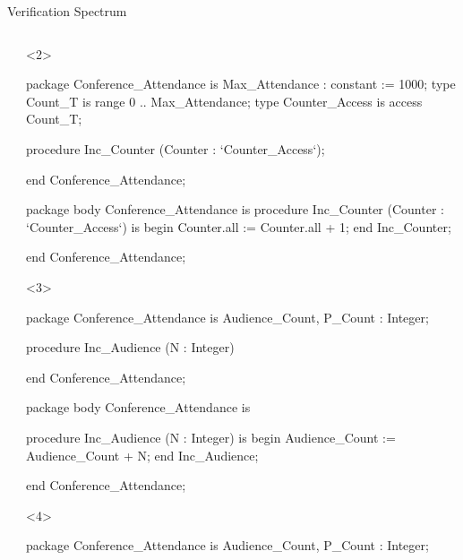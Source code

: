 \documentclass{beamer}
\begin{document}
\begin{frame}[fragile]{Verification Spectrum}
\begin{columns}
\begin{column}{2cm}
    \end{column}

    \begin{column}{9cm}

      \begin{onlyenv}<2>
      \begin{pxcode}[language=SPARK,style=magic,gobble=8]
        package Conference_Attendance
        is
           Max_Attendance : constant := 1000;
           type Count_T is range 0 .. Max_Attendance;
           type Counter_Access is access Count_T;

           procedure Inc_Counter (Counter : `Counter_Access`);

        end Conference_Attendance;

        package body Conference_Attendance
        is
           procedure Inc_Counter (Counter : `Counter_Access`)
           is
           begin
              Counter.all := Counter.all + 1;
           end Inc_Counter;

        end Conference_Attendance;

      \end{pxcode}
      \end{onlyenv}

      \begin{onlyenv}<3>
      \begin{pxcode}[language=SPARK,style=magic,gobble=8]
        package Conference_Attendance
        is
           Audience_Count, P_Count : Integer;

           procedure Inc_Audience (N : Integer)

        end Conference_Attendance;

        package body Conference_Attendance
        is

           procedure Inc_Audience (N : Integer)
           is
           begin
              Audience_Count := Audience_Count + N;
           end Inc_Audience;

        end Conference_Attendance;
      \end{pxcode}
      \end{onlyenv}


      \begin{onlyenv}<4>
      \begin{pxcode}[language=SPARK,style=magic,gobble=8]
        package Conference_Attendance
        is
           Audience_Count, P_Count : Integer;


\end{pxcode}
\end{onlyenv}
\end{column}
\end{columns}
\end{frame}
\end{document}

